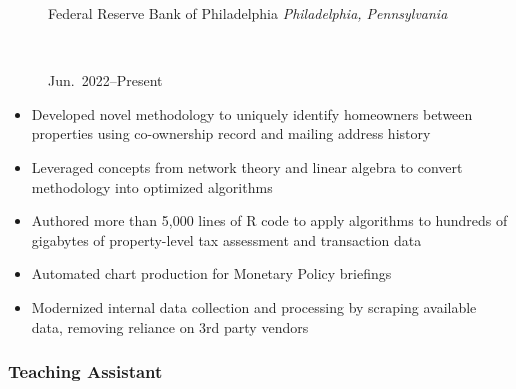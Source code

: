 \documentclass[
  letterpaper,
  DIV=11,
  numbers=noendperiod]{scrartcl}
\providecommand{\tightlist}{%
  \setlength{\itemsep}{0pt}\setlength{\parskip}{0pt}}\usepackage{longtable,booktabs,array}
\begin{document}
\begin{figure}

\begin{minipage}[t]{0.49\linewidth}

{\centering 

\RaggedRight Federal Reserve Bank of Philadelphia \newline
\emph{Philadelphia, Pennsylvania}

}

\end{minipage}%
%
\begin{minipage}[t]{0.02\linewidth}

{\centering 

~

}

\end{minipage}%
%
\begin{minipage}[t]{0.49\linewidth}

{\centering 

\RaggedLeft

Jun.~2022--Present

}

\end{minipage}%

\end{figure}

\begin{itemize}
\tightlist
\item
  Developed novel methodology to uniquely identify homeowners between
  properties using co-ownership record and mailing address history
\item
  Leveraged concepts from network theory and linear algebra to convert
  methodology into optimized algorithms
\item
  Authored more than 5,000 lines of R code to apply algorithms to
  hundreds of gigabytes of property-level tax assessment and transaction
  data
\item
  Automated chart production for Monetary Policy briefings
\item
  Modernized internal data collection and processing by scraping
  available data, removing reliance on 3rd party vendors
\end{itemize}

\hypertarget{teaching-assistant}{%
\subsubsection{Teaching Assistant}\label{teaching-assistant}}
\end{document}
